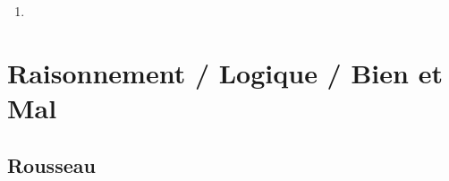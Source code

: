 \documentclass[a4paper, 11pt, hidelinks]{article}
\begin{document}
\begin{enumerate}
    \item 
\end{enumerate}














































\section{Raisonnement / Logique / Bien et Mal}



\subsection{Rousseau}
\end{document}
